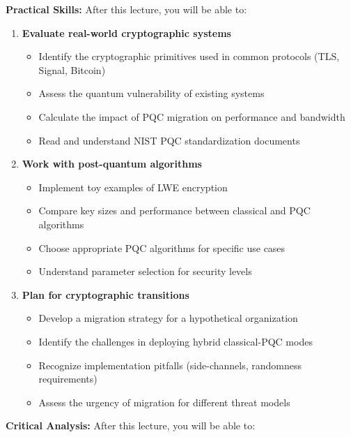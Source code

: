 \documentclass[11pt,a4paper]{article}
\begin{document}
\textbf{Practical Skills:} After this lecture, you will be able to:

\begin{enumerate}
    \item \textbf{Evaluate real-world cryptographic systems}
    \begin{itemize}
        \item Identify the cryptographic primitives used in common protocols (TLS, Signal, Bitcoin)
        \item Assess the quantum vulnerability of existing systems
        \item Calculate the impact of PQC migration on performance and bandwidth
        \item Read and understand NIST PQC standardization documents
    \end{itemize}
    
    \item \textbf{Work with post-quantum algorithms}
    \begin{itemize}
        \item Implement toy examples of LWE encryption
        \item Compare key sizes and performance between classical and PQC algorithms
        \item Choose appropriate PQC algorithms for specific use cases
        \item Understand parameter selection for security levels
    \end{itemize}
    
    \item \textbf{Plan for cryptographic transitions}
    \begin{itemize}
        \item Develop a migration strategy for a hypothetical organization
        \item Identify the challenges in deploying hybrid classical-PQC modes
        \item Recognize implementation pitfalls (side-channels, randomness requirements)
        \item Assess the urgency of migration for different threat models
    \end{itemize}
\end{enumerate}

\textbf{Critical Analysis:} After this lecture, you will be able to:
\end{document}
